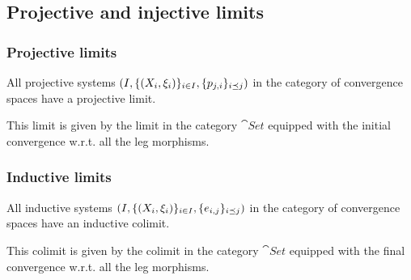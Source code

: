 \subsection{Projective and injective limits}
\subsubsection{Projective limits}
\begin{proposition}
All projective systems $\sSet{I, \{\sSet{X_i, \xi_i}\}_{i\in I}, \{p_{j,i}\}_{i\preceq j}}$ in the category of convergence spaces have a projective limit.

This limit is given by the limit in the category $\cat{Set}$ equipped with the initial convergence w.r.t. all the leg morphisms.
\end{proposition}

\subsubsection{Inductive limits}
\begin{proposition} \label{convergenceInductiveLimit}
All inductive systems $\sSet{I, \{\sSet{X_i, \xi_i}\}_{i\in I}, \{e_{i,j}\}_{i\preceq j}}$ in the category of convergence spaces have an inductive colimit.

This colimit is given by the colimit in the category $\cat{Set}$ equipped with the final convergence w.r.t. all the leg morphisms.
\end{proposition}

